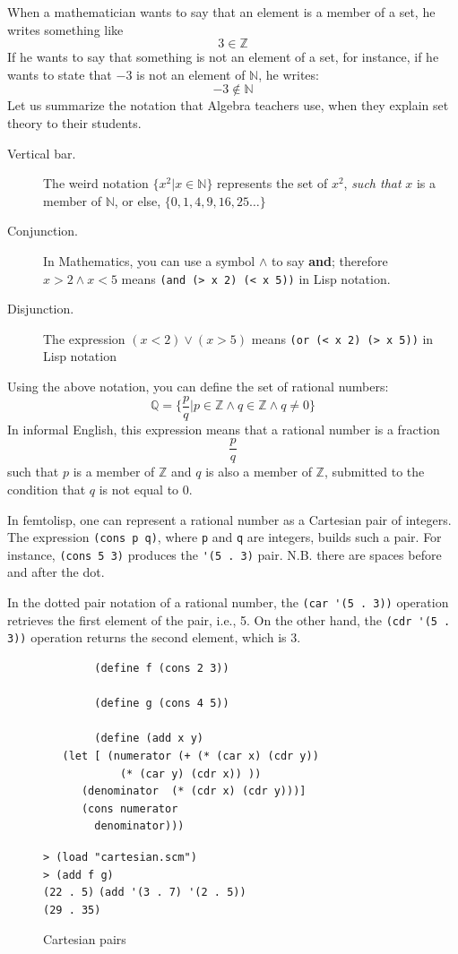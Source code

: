\documentclass[a4paper,12pt]{book}
\newenvironment{fmpage}[1]
{\begin{lrbox}{\fmbox}\begin{minipage}{#1}}
{\end{minipage}\end{lrbox}\fbox{\usebox{\fmbox}}}
\begin{document}
When a mathematician wants to say that an element is a member of a set, he writes something like
$$3  \in \mathbb{Z}$$
If he wants to say that something is not an element of a set, for instance, if he wants to state that $-3$ is not an element of $\mathbb{N}$, he writes:
$$-3  \notin  \mathbb{N}$$
Let us summarize the notation that Algebra teachers use, when they explain set theory to their students.
\begin{description}
	\item[Vertical bar.] The weird notation $\{x^2 | x \in \mathbb{N}\}$
		represents the set of
		$x^2$, {\em such that} $x$ is a member of $\mathbb{N}$, or else,
		$\{0, 1, 4, 9, 16, 25\ldots\}$
	\item[Conjunction.] In Mathematics, you can use a symbol $\wedge$
		to say {\bf\small and}; therefore $x>2 \wedge x<5$ means 
		\verb|(and (> x 2) (< x 5))| in Lisp notation.
	\item[Disjunction.] The expression
		$(x<2) \vee (x>5)$
		means \verb|(or (< x 2) (> x 5))| in Lisp notation
\end{description}
Using the above notation, you can define the set of rational numbers:
$$\mathbb{Q}=\{\frac{p}{q} | p \in \mathbb{Z} \wedge q \in \mathbb{Z} 
\wedge q \neq 0\}$$
In informal English, this expression means that a rational number is a fraction $$\frac{p}{q}$$ such that $p$ is a member of $\mathbb{Z}$ and $q$ is also a member of $\mathbb{Z}$, submitted to the condition that $q$ is not equal to $0$.

In femtolisp, one can represent a rational number
as a Cartesian pair of integers. The expression \verb|(cons p q)|,
where \verb|p| and \verb|q| are integers, builds such a pair.
For instance, \verb|(cons 5 3)| produces the
\verb|'(5 . 3)| pair. N.B. there
are spaces before and after the dot.\label{page:cartesian-pair}

In the dotted pair notation of a rational number,
the \verb|(car '(5 . 3))| operation retrieves
the first element of the pair, i.e., 5.
On the other hand, the 
\verb|(cdr '(5 . 3))| operation
returns the second element, which is 3.

\begin{figure}[!h]
	\begin{fmpage}{0.9\linewidth}
		\begin{verbatim}
		(define f (cons 2 3))

		(define g (cons 4 5))

		(define (add x y)
   (let [ (numerator (+ (* (car x) (cdr y))
			(* (car y) (cdr x)) ))
	  (denominator  (* (cdr x) (cdr y)))]
      (cons numerator
	    denominator))) 
		\end{verbatim}
	\end{fmpage}

	\begin{fmpage}{0.9\linewidth}
		\verb|> (load "cartesian.scm")|\\
		\verb|> (add f g)|\\
		\verb|(22 . 5)|
		\verb|(add '(3 . 7) '(2 . 5))|\\
		\verb|(29 . 35)|
	\end{fmpage}
	\caption{Cartesian pairs}
	\label{fig:cartesian-pairs}
\end{figure}
\end{document}
